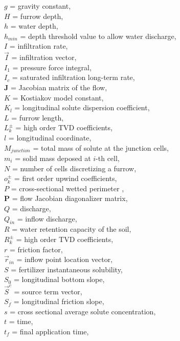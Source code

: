 \documentclass[review,authoryear]{elsarticle}
\begin{document}
$g$ = gravity constant,\\
$H$ = furrow depth,\\
$h$ = water depth,\\
$h_{min}$ = depth threshold value to allow water discharge,\\ 
$I$ = infiltration rate,\\
$\vec{I}$ = infiltration vector,\\
$I_1$ = pressure force integral,\\
$I_c$ = saturated infiltration long-term rate,\\
$\mathbf{J}$ = Jacobian matrix of the flow,\\
$K$ = Kostiakov model constant,\\
$K_l$ = longitudinal solute dispersion coefficient,\\
$L$ = furrow length,\\
$L_k^\pm$ = high order TVD coefficients,\\
$l$ = longitudinal coordinate,\\
$M_{junction}$ = total mass of solute at the junction cells,\\
$m_i$ = solid mass deposed at $i$-th cell,\\
$N$ = number of cells discretizing a furrow,\\
$o_k^\pm$ = first order upwind coefficients,\\
$P$ = cross-sectional wetted perimeter ,\\
$\mathbf{P}$ = flow Jacobian diagonalizer matrix,\\
$Q$ = discharge,\\
$Q_{in}$ = inflow discharge,\\
$R$ = water retention capacity of the soil,\\
$R_k^\pm$ = high order TVD coefficients,\\
$r$ = friction factor,\\
$\vec{r}_{in}$ = inflow point location vector,\\
$S$ = fertilizer instantaneous solubility,\\
$S_0$ = longitudinal bottom slope,\\
$\vec{S}^c$ = source term vector,\\
$S_f$ = longitudinal friction slope,\\
$s$ = cross sectional average solute concentration,\\
$t$ = time,\\
$t_f$ = final application time,\\
\end{document}
